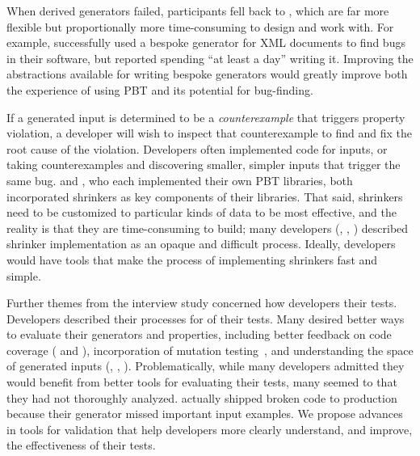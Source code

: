 When derived generators
failed, participants fell back to , which
are far more flexible but proportionally more time-consuming to design and work
with. For example,  successfully used a bespoke
generator for XML documents to find bugs in their software,
but reported spending ``at least a day'' writing it.
Improving the abstractions available for writing bespoke generators would
greatly improve both the experience of using PBT and its potential for
bug-finding.

If a generated input is determined to be a {\em counterexample} that triggers
property violation, a developer will wish to inspect that counterexample to find
and fix the root cause of the violation. Developers often implemented code for
 inputs, or taking counterexamples and discovering smaller,
simpler inputs that trigger the same bug.  
and , who each implemented their own PBT libraries, both
incorporated shrinkers as key components of their libraries. That said,
shrinkers need to be customized to particular kinds of data to be most
effective, and the reality is that they are time-consuming to build; many
developers
(,  , )
described shrinker implementation as an opaque and difficult process.
Ideally, developers would have tools that make the process of implementing
shrinkers fast and simple.

Further themes from the interview study concerned how developers
 their tests.
Developers described their processes for  of their tests. Many
desired
better ways to evaluate their generators and properties, including
better feedback on code coverage ( and ),
incorporation of mutation
testing~\cite{papadakis_mutation_2018}, and understanding the space of generated
inputs (, , ). Problematically,
while many developers admitted they would benefit from better tools for
evaluating their tests, many seemed to
 that they had not thoroughly
analyzed.  actually shipped broken code to production because
their generator missed important input examples. We propose advances in tools
for validation that help developers more clearly understand, and improve, the
effectiveness of their tests.

